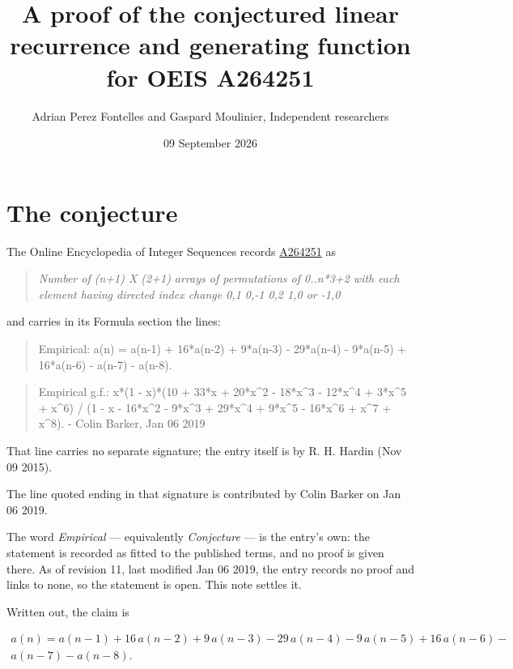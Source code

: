 \documentclass[11pt]{article}
\title{A proof of the conjectured linear recurrence and generating function for OEIS A264251}
\author{Adrian Perez Fontelles and Gaspard Moulinier, Independent researchers}
\date{09 September 2026}
\theoremstyle{definition}
\begin{document}
\maketitle
\section{The conjecture}

The Online Encyclopedia of Integer Sequences records \href{https://oeis.org/A264251}{A264251} as

\begin{quote}\itshape Number of (n+1) X (2+1) arrays of permutations of 0..n*3+2 with each element having directed index change 0,1 0,-1 0,2 1,0 or -1,0\end{quote}

and carries in its Formula section the lines:

\begin{quote}\ttfamily Empirical: a(n) = a(n-1) + 16*a(n-2) + 9*a(n-3) - 29*a(n-4) - 9*a(n-5) + 16*a(n-6) - a(n-7) - a(n-8).\end{quote}

\begin{quote}\ttfamily Empirical g.f.: x*(1 - x)*(10 + 33*x + 20*x\textasciicircum{}2 - 18*x\textasciicircum{}3 - 12*x\textasciicircum{}4 + 3*x\textasciicircum{}5 + x\textasciicircum{}6) / (1 - x - 16*x\textasciicircum{}2 - 9*x\textasciicircum{}3 + 29*x\textasciicircum{}4 + 9*x\textasciicircum{}5 - 16*x\textasciicircum{}6 + x\textasciicircum{}7 + x\textasciicircum{}8). - Colin Barker, Jan 06 2019\end{quote}

That line carries no separate signature; the entry itself is by R. H. Hardin (Nov 09 2015).

The line quoted ending in that signature is contributed by Colin Barker on Jan 06 2019.

The word {\itshape Empirical} --- equivalently {\itshape Conjecture} --- is the entry's own: the statement is recorded as fitted to the published terms, and no proof is given there. As of revision 11, last modified Jan 06 2019, the entry records no proof and links to none, so the statement is open. This note settles it.

Written out, the claim is

\begin{multline*} a(n) = a(n-1) + 16\,a(n-2) + 9\,a(n-3) - 29\,a(n-4) - 9\,a(n-5) + 16\,a(n-6) - \\ a(n-7) - a(n-8). \end{multline*}
\end{document}
